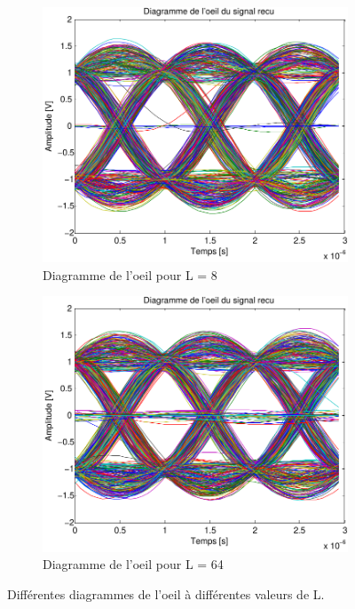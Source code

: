 \documentclass[a4paper,11pt]{article}
\begin{document}
\begin{figure}
	\begin{subfigure}{.5\textwidth}
  		\centering
  		\includegraphics[width=1\linewidth]{Q10-EbNo20-crop.pdf}
  		\caption{Diagramme de l'oeil pour L = 8}
  		\label{fig:q10l16}
	\end{subfigure}
	\begin{subfigure}{.5\textwidth}
  		\centering
  		\includegraphics[width=1\linewidth]{Q10-L64-crop.pdf}
  		\caption{Diagramme de l'oeil pour L = 64}
  		\label{fig:q10l64}
	\end{subfigure}
	\caption{Différentes diagrammes de l'oeil à différentes valeurs de L.}
	\label{fig:q10l}
\end{figure} 
\end{document}

